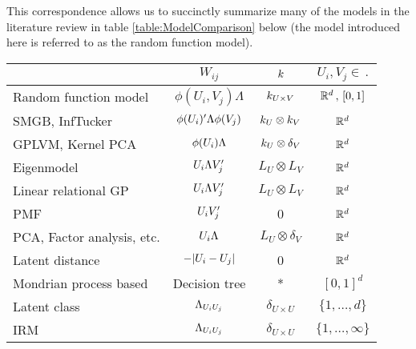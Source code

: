 This correspondence allows us to succinctly summarize many of the models in the literature review in table \ref{table:ModelComparison} below (the model introduced here is referred to as the random function model).
\begin{table}[h]
  \centering
  \begin{tabular}{l|ccc}%
    & $W_{ij}$ & $k$ & $U_i, V_j \in \, .$ \\%
    \midrule
    Random function model & $\phi(U_i, V_j)\Lambda$ & $k_{U\times V}$ & $\mathbb{R}^d \, , \, [0,1]$\\%
    SMGB, InfTucker & $\phi(U_i)'\Lambda\phi(V_j)$ & $k_U \otimes k_V$ & $\mathbb{R}^d$\\%
    GPLVM, Kernel PCA & $\phi(U_i)\Lambda$ & $k_U \otimes \delta_V$ & $\mathbb{R}^d$ \\%
    Eigenmodel & $U_i\Lambda V_j'$ & $L_U \otimes L_V$ & $\mathbb{R}^d$ \\%
    Linear relational GP & $U_i\Lambda V_j'$ & $L_U \otimes L_V$ & $\mathbb{R}^d$ \\%
    PMF & $U_i V_j'$ & 0 & $\mathbb{R}^d$ \\%
    PCA, Factor analysis, etc. & $U_i\Lambda$ & $L_U \otimes \delta_V$ & $\mathbb{R}^d$ \\%
    Latent distance & $-|U_i - U_j|$ & 0 & $\mathbb{R}^d$ \\%
    Mondrian process based & Decision tree & * & $[0, 1]^d$ \\%
    \midrule
    Latent class & $\Lambda_{U_iU_j}$ & $\delta_{U\times U}$ & $\{1,\ldots,d\}$ \\%
    IRM &$\Lambda_{U_iU_j}$ & $\delta_{U\times U}$ & $\{1,\ldots,\infty\}$ \\%

\end{tabular}
\end{table}
